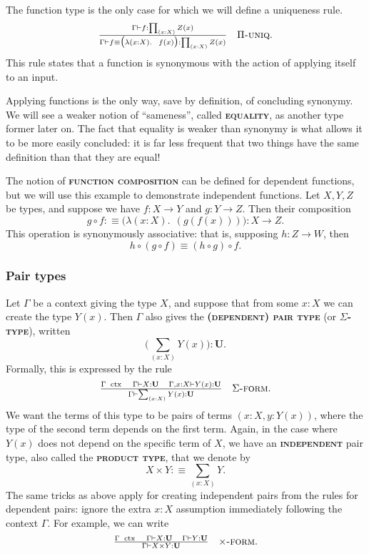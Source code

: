 \documentclass{article}
\newcommand{\defn}[1]{{\scshape\bfseries\color{MPBemph}#1}}
\newcommand{\infrule}[3]{\genfrac{}{}{}{}{#1}{#2}\hspace{1em}{\textsc{#3}}}
\DeclareMathOperator{\ctx}{~ctx}
\newcommand{\gives}{\vdash}
\newcommand{\eql}{\mathbin{:\equiv}}
\newcommand{\U}{\mathbf{U}}
\newcommand{\tpi}[1]{\prod_{(#1)}}
\newcommand{\tsigma}[1]{\sum_{(#1)}}
\newcommand{\1}{\textbf{1}}
\newcommand{\0}{\mathbf{0}}
\newcommand{\2}{\textbf{2}}
\begin{document}
The function type is the only case for which we will define a uniqueness rule.
\[ \OD \infrule{\Gamma \gives f : \tpi{x : X} Z(x)}{\Gamma \gives f \equiv \big( \lambda(x : X).~~f(x) \big) : \tpi{x : X} Z(x)}{\( \Pi \)-uniq}. \]
This rule states that a function is synonymous with the action of applying itself to an input.

Applying functions is the only way, save by definition, of concluding synonymy. We will see a weaker notion of ``sameness'', called \defn{equality}, as another type former later on. The fact that equality is weaker than synonymy is what allows it to be more easily concluded: it is far less frequent that two things have the same definition than that they are equal!

The notion of \defn{function composition} can be defined for dependent functions, but we will use this example to demonstrate independent functions. Let \( X, Y, Z \) be types, and suppose we have \( f : X \to Y \) and \( g : Y \to Z \). Then their composition
\[ g \circ f \eql \big( \lambda(x : X).~~(g(f(x))) \big) : X \to Z. \]
This operation is synonymously associative: that is, supposing \( h : Z \to W \), then
\[ h \circ (g \circ f) \equiv (h \circ g) \circ f. \]
\subsubsection{Pair types}
Let \( \Gamma \) be a context giving the type \( X \), and suppose that from some \( x : X \) we can create the type \( Y(x) \). Then \( \Gamma \) also gives the \defn{(dependent) pair type} (or \defn{\( \Sigma \)-type}), written
\[ \big( \tsigma{x : X} Y(x) \big) : \U. \]
Formally, this is expressed by the rule
\[ \OD \infrule{\Gamma \ctx \hspace{1em} \Gamma \gives X : \U \hspace{1em} \Gamma, x : X \gives Y(x) : \U}{\Gamma \gives \tsigma{x : X} Y(x) : \U}{\( \Sigma \)-form}. \]
We want the terms of this type to be pairs of terms \( (x : X, y : Y(x)) \), where the type of the second term depends on the first term. Again, in the case where \( Y(x) \) does not depend on the specific term of \( X \), we have an \defn{independent} pair type, also called the \defn{product type}, that we denote by
\[ X \times Y \eql \tsigma{x : X} Y. \]
The same tricks as above apply for creating independent pairs from the rules for dependent pairs: ignore the extra \( x : X \) assumption immediately following the context \( \Gamma \). For example, we can write
\[ \OD \infrule{\Gamma \ctx \hspace{1em} \Gamma \gives X : \U \hspace{1em} \Gamma \gives Y : \U}{\Gamma \gives X \times Y : \U}{\( \times \)-form}. \]
\end{document}
